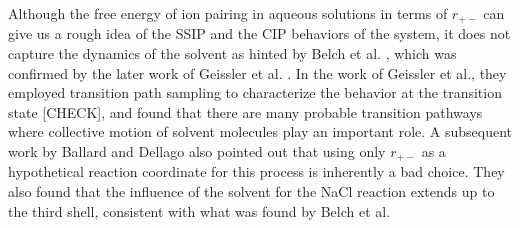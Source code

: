 \begin{spacing}{2.0}
    Although the free energy of ion pairing in aqueous solutions in terms of $r_{+-}$ can give us a rough idea of the SSIP and the CIP behaviors 
    of the system, it does not capture the dynamics of the solvent as hinted by Belch et al. \cite{P-JACS-1986-v108-Belch}, which was confirmed 
    by the later work of Geissler et al. \cite{P-JPhysChemB-1999-v103-Geissler}. In the work of Geissler et al., they employed transition path 
    sampling to characterize the behavior at the transition state [CHECK], and found that there are many probable transition pathways where 
    collective motion of solvent molecules play an important role. A subsequent work by Ballard and Dellago also pointed out that using only 
    $r_{+-}$ as a hypothetical reaction coordinate for this process is inherently a bad choice. \cite{P-JPhysChemB-2012-v116-Ballard} They also 
    found that the influence of the solvent for the NaCl reaction extends up to the third shell, consistent with what was found by Belch et al. 
    \cite{P-JACS-1986-v108-Belch}


\end{spacing}
